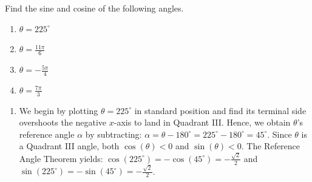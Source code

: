 \documentclass{ximera}
\begin{document}
\begin{example} \label{refangleex}  Find the sine and cosine of the following angles.

\begin{enumerate}

\item  $\theta = 225^{\circ}$

\item  $\theta = \frac{11 \pi}{6}$

\item  $\theta = -\frac{5 \pi}{4}$

\item  $\theta = \frac{7 \pi}{3}$ \label{coterminalsamesinecosineexample}


\end{enumerate}


\begin{explanation}

\begin{enumerate}

\item  We begin by plotting $\theta = 225^{\circ}$ in standard position and find its terminal side overshoots the negative $x$-axis to land in Quadrant III.  Hence, we obtain $\theta$'s reference angle $\alpha$ by subtracting: $\alpha = \theta - 180^{\circ} = 225^{\circ} - 180^{\circ} = 45^{\circ}$.  Since $\theta$ is a Quadrant III angle, both $\cos(\theta) < 0$ and $\sin(\theta) < 0$.  The Reference Angle Theorem yields: $\cos\left(225^{\circ}\right) = -\cos\left(45^{\circ}\right) = -\frac{\sqrt{2}}{2}$ and $\sin\left(225^{\circ}\right) = - \sin\left(45^{\circ}\right) = -\frac{\sqrt{2}}{2}$.

\begin{image}
\end{image}
\end{enumerate}
\end{explanation}
\end{example}
\end{document}
